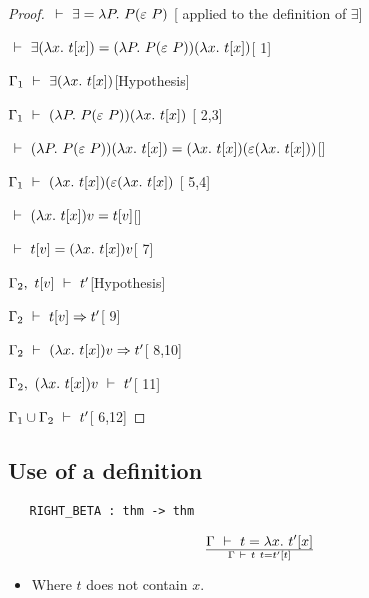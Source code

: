 \vspace{12pt plus2pt minus1pt}

\begin{proof}
\item $\ \vdash\  \exists = \lambda P.\  P(\varepsilon\ P)$\hfill
[ applied to the definition of $\exists$]
\item $\ \vdash\ \exists(\lambda x.\ t[x]) =
(\lambda P.\ P(\varepsilon\ P))(\lambda x.\ t[x])$\hfill [ 1]
\item $\Gamma_1\ \vdash\ \exists(\lambda x.\ t[x])$\hfill [Hypothesis]
\item $\Gamma_1\turn (\lquant{P}P(\hilbert\ P))(\lquant{x}t[x])$
\hfill [ 2,3]
\item $\turn(\lquant{P}P(\hilbert\ P))(\lquant{x}t[x]) =
(\lquant{x}t[x])(\hilbert(\lquant{x}t[x]))$\hfill []
\item $\Gamma_1\ \vdash\ (\lambda x.\ t[x])(\varepsilon(\lambda x.\ t[x])$\hfill
[ 5,4]
\item $\ \vdash\ (\lambda x.\ t[x])v = t[v]$\hfill []
\item $\ \vdash\  t[v] =(\lambda x.\ t[x])v$\hfill [ 7]
\item $\Gamma_2,\ t[v]\ \vdash\  t'$\hfill [Hypothesis]
\item $\Gamma_2\ \vdash\  t[v]\Rightarrow t'$\hfill [ 9]
\item $\Gamma_2\ \vdash\ (\lambda x.\ t[x])v\Rightarrow t'$\hfill [ 8,10]
\item $\Gamma_2,\ (\lambda x.\ t[x])v\ \vdash\  t'$\hfill [ 11]
\item $\Gamma_1\cup\Gamma_2\ \vdash\  t'$\hfill [ 6,12]
\end{proof}

\subsection{Use of a definition}

\begin{holboxed}
\begin{verbatim}
   RIGHT_BETA : thm -> thm
\end{verbatim}\end{holboxed}

\vspace{12pt plus2pt minus1pt}

$$\Gamma\ \vdash\  t = \lambda x.\ t'[x]
\over \Gamma\ \vdash\  t\ t = t'[t]$$
\begin{itemize}
\item Where  $t$ does not contain $x$.
\end{itemize}

